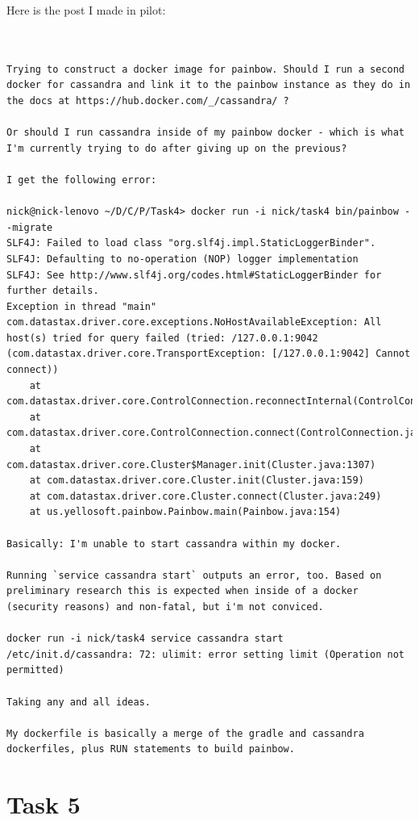 \documentclass{article}
\begin{document}
Here is the post I made in pilot:
\begin{verbatim}


Trying to construct a docker image for painbow. Should I run a second docker for cassandra and link it to the painbow instance as they do in the docs at https://hub.docker.com/_/cassandra/ ?

Or should I run cassandra inside of my painbow docker - which is what I'm currently trying to do after giving up on the previous?

I get the following error:

nick@nick-lenovo ~/D/C/P/Task4> docker run -i nick/task4 bin/painbow --migrate
SLF4J: Failed to load class "org.slf4j.impl.StaticLoggerBinder".
SLF4J: Defaulting to no-operation (NOP) logger implementation
SLF4J: See http://www.slf4j.org/codes.html#StaticLoggerBinder for further details.
Exception in thread "main" com.datastax.driver.core.exceptions.NoHostAvailableException: All host(s) tried for query failed (tried: /127.0.0.1:9042 (com.datastax.driver.core.TransportException: [/127.0.0.1:9042] Cannot connect))
    at com.datastax.driver.core.ControlConnection.reconnectInternal(ControlConnection.java:227)
    at com.datastax.driver.core.ControlConnection.connect(ControlConnection.java:82)
    at com.datastax.driver.core.Cluster$Manager.init(Cluster.java:1307)
    at com.datastax.driver.core.Cluster.init(Cluster.java:159)
    at com.datastax.driver.core.Cluster.connect(Cluster.java:249)
    at us.yellosoft.painbow.Painbow.main(Painbow.java:154)

Basically: I'm unable to start cassandra within my docker.

Running `service cassandra start` outputs an error, too. Based on preliminary research this is expected when inside of a docker (security reasons) and non-fatal, but i'm not conviced.

docker run -i nick/task4 service cassandra start
/etc/init.d/cassandra: 72: ulimit: error setting limit (Operation not permitted)

Taking any and all ideas.

My dockerfile is basically a merge of the gradle and cassandra dockerfiles, plus RUN statements to build painbow.
\end{verbatim}

\section{Task 5}
\end{document}
